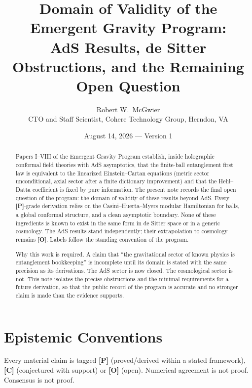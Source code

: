 \documentclass[11pt]{article}
\title{\textbf{Domain of Validity of the Emergent Gravity Program:\\
AdS Results, de Sitter Obstructions, and the Remaining Open Question}}
\author{Robert W.\ McGwier\\
\small CTO and Staff Scientist, Cohere Technology Group, Herndon, VA}
\date{August 14, 2026 --- Version 1}
\newcommand{\pP}{\textbf{[P]}}
\newcommand{\pC}{\textbf{[C]}}
\newcommand{\pO}{\textbf{[O]}}
\begin{document}
\maketitle

\begin{abstract}
\noindent
Papers I--VIII of the Emergent Gravity Program establish, inside
holographic conformal field theories with AdS asymptotics, that the
finite-ball entanglement first law is equivalent to the linearized
Einstein--Cartan equations (metric sector unconditional, axial sector
after a finite dictionary improvement) and that the Hehl--Datta
coefficient is fixed by pure information. The present note records the
final open question of the program: the domain of validity of these
results beyond AdS. Every \pP{}-grade derivation relies on the
Casini--Huerta--Myers modular Hamiltonian for balls, a global conformal
structure, and a clean asymptotic boundary. None of these ingredients
is known to exist in the same form in de Sitter space or in a generic
cosmology. The AdS results stand independently; their extrapolation to
cosmology remains \pO{}. Labels follow the standing convention of the
program.

Why this work is required. A claim that ``the gravitational sector of
known physics is entanglement bookkeeping'' is incomplete until its
domain is stated with the same precision as its derivations. The AdS
sector is now closed. The cosmological sector is not. This note isolates
the precise obstructions and the minimal requirements for a future
derivation, so that the public record of the program is accurate and no
stronger claim is made than the evidence supports.
\end{abstract}

\section*{Epistemic Conventions}
Every material claim is tagged \pP{} (proved/derived within a stated
framework), \pC{} (conjectured with support) or \pO{} (open).
Numerical agreement is not proof. Consensus is not proof.
\end{document}
